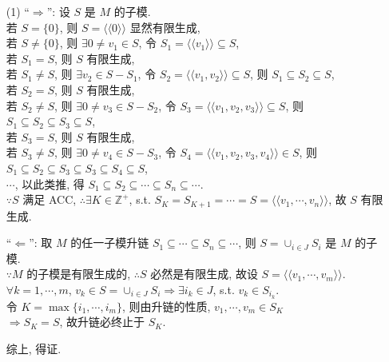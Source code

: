 \documentclass{note}
\begin{document}
\begin{pf}
    \begin{itemize}
        \item[(1)] ``$\Longrightarrow$'': 设 $S$ 是 $M$ 的子模.\\
        若 $S=\{0\}$, 则 $S=\langle\langle 0\rangle\rangle$ 显然有限生成,\\
        若 $S\neq\{0\}$, 则 $\exists 0\neq v_1\in S$, 令 $S_1=\langle\langle v_1\rangle\rangle\subseteq S$,\\
        若 $S_1=S$, 则 $S$ 有限生成,\\
        若 $S_1\neq S$, 则 $\exists v_2\in S-S_1$, 令 $S_2=\langle\langle v_1,v_2\rangle\rangle\subseteq S$, 则 $S_1\subseteq S_2\subseteq S$,\\
        若 $S_2=S$, 则 $S$ 有限生成,\\
        若 $S_2\neq S$, 则 $\exists 0\neq v_3\in S-S_2$, 令 $S_3=\langle\langle v_1,v_2,v_3\rangle\rangle\subseteq S$, 则 $S_1\subseteq S_2\subseteq S_3\subseteq S$,\\
        若 $S_3=S$, 则 $S$ 有限生成,\\
        若 $S_3\neq S$, 则 $\exists 0\neq v_4\in S-S_3$, 令 $S_4=\langle\langle v_1,v_2,v_3,v_4\rangle\rangle\in S$, 则 $S_1\subseteq S_2\subseteq S_3\subseteq S_3\subseteq S_4\subseteq S$,\\
        $\cdots$, 以此类推, 得 $S_1\subseteq S_2\subseteq\cdots\subseteq S_n\subseteq\cdots$.\\
        $\because S$ 满足 ACC, $\therefore\exists K\in\mathbb{Z}^+$, s.t. $S_K=S_{K+1}=\cdots=S=\langle\langle v_1,\cdots,v_n\rangle\rangle$, 故 $S$ 有限生成.

        ``$\Longleftarrow$'': 取 $M$ 的任一子模升链 $S_1\subseteq\cdots\subseteq S_n\subseteq\cdots$, 则 $S=\cup_{i\in J}S_i$ 是 $M$ 的子模.\\
        $\because M$ 的子模是有限生成的, $\therefore S$ 必然是有限生成, 故设 $S=\langle\langle v_1,\cdots,v_m\rangle\rangle$.\\
        $\forall k=1,\cdots,m$, $v_k\in S=\cup_{i\in J}S_i\Longrightarrow\exists i_k\in J$, s.t. $v_k\in S_{i_k}$.\\
        令 $K=\max\{i_1,\cdots,i_m\}$, 则由升链的性质, $v_1,\cdots,v_m\in S_K$\\
        $\Longrightarrow S_K=S$, 故升链必终止于 $S_K$.

        综上, 得证.
    \end{itemize}
\end{pf}
\end{document}
